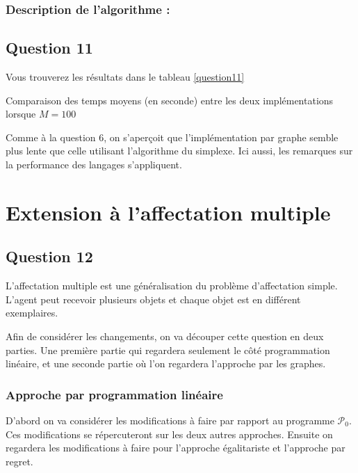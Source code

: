 \documentclass[a4paper, titlepage, oneside, 12pt]{article}%
\begin{document}
\subsubsection{Description de l'algorithme :}


\subsection{Question 11}
Vous trouverez les résultats dans le tableau \ref{question11}
\begin{table}[h]
\begin{center}
\caption{Comparaison des temps moyens (en seconde) entre les deux implémentations lorsque $M=100$}
\label{question11}
\end{center}
\end{table}

Comme à la question $6$, on s'aperçoit que l'implémentation par graphe semble plus lente que celle utilisant l'algorithme du simplexe. Ici aussi, les remarques sur la performance des langages s'appliquent.
\section{Extension à l'affectation multiple}

\subsection{Question 12}

L'affectation multiple est une généralisation du problème d'affectation simple. L'agent peut recevoir plusieurs objets et chaque objet est en différent exemplaires.

Afin de considérer les changements, on va découper cette question en deux parties. Une première partie qui regardera seulement le côté programmation linéaire, et une seconde partie où l'on regardera l'approche par les graphes.

\subsubsection{Approche par programmation linéaire}

D'abord on va considérer les modifications à faire par rapport au programme $\mathcal{P}_0$. Ces modifications se répercuteront sur les deux autres approches. Ensuite on regardera les modifications à faire pour l'approche égalitariste et l'approche par regret.
\end{document}

